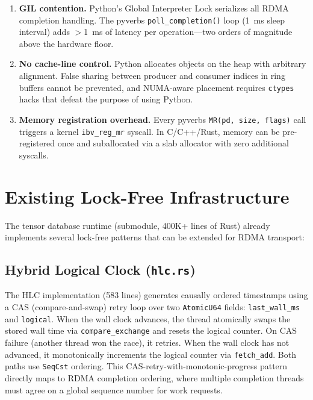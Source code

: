 \documentclass[11pt,letterpaper]{article}
\begin{document}
\begin{enumerate}
    \item \textbf{GIL contention.} Python's Global Interpreter Lock serializes all RDMA completion handling. The pyverbs \texttt{poll\_completion()} loop (1~ms sleep interval) adds $>$1~ms of latency per operation---two orders of magnitude above the hardware floor.

    \item \textbf{No cache-line control.} Python allocates objects on the heap with arbitrary alignment. False sharing between producer and consumer indices in ring buffers cannot be prevented, and NUMA-aware placement requires \texttt{ctypes} hacks that defeat the purpose of using Python.

    \item \textbf{Memory registration overhead.} Every pyverbs \texttt{MR(pd, size, flags)} call triggers a kernel \texttt{ibv\_reg\_mr} syscall. In C/C++/Rust, memory can be pre-registered once and suballocated via a slab allocator with zero additional syscalls.
\end{enumerate}

\section{Existing Lock-Free Infrastructure}

The tensor database runtime (submodule, 400K+ lines of Rust) already implements several lock-free patterns that can be extended for RDMA transport:

\subsection{Hybrid Logical Clock (\texttt{hlc.rs})}

The HLC implementation (583 lines) generates causally ordered timestamps using a CAS (compare-and-swap) retry loop over two \texttt{AtomicU64} fields: \texttt{last\_wall\_ms} and \texttt{logical}. When the wall clock advances, the thread atomically swaps the stored wall time via \texttt{compare\_exchange} and resets the logical counter. On CAS failure (another thread won the race), it retries. When the wall clock has not advanced, it monotonically increments the logical counter via \texttt{fetch\_add}. Both paths use \texttt{SeqCst} ordering. This CAS-retry-with-monotonic-progress pattern directly maps to RDMA completion ordering, where multiple completion threads must agree on a global sequence number for work requests.
\end{document}
